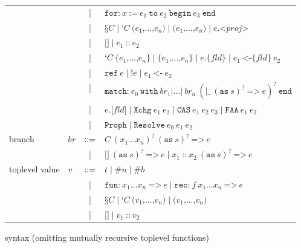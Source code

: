 \begin{figure}[tp]
\begin{tabular}{llcl}
  \\
    && | &
    $\texttt{for:}\ x\ \texttt{:=}\ e_1\ \texttt{to}\ e_2\ \texttt{begin}\ e_3\ \texttt{end}$
  \\
    && | &
    $\texttt{§}C \mid \texttt{‘} C\ \texttt{(} e_1 \texttt{,} \dots \texttt{,} e_n \texttt{)} \mid \texttt{(} e_1 \texttt{,} \dots \texttt{,} e_n \texttt{)} \mid e \texttt{.<} \mathit{proj} \texttt{>}$
  \\
    && | &
    $\texttt{[]} \mid e_1\ \texttt{::}\ e_2$
  \\
    && | &
    $\texttt{‘} C\ \texttt{\{} e_1 \texttt{,} \dots \texttt{,} e_n \texttt{\}} \mid \texttt{\{} e_1 \texttt{,} \dots \texttt{,} e_n \texttt{\}} \mid e \texttt{.\{} \mathit{fld} \texttt{\}} \mid e_1\ \texttt{<-\{} \mathit{fld} \texttt{\}}\ e_2$
  \\
    && | &
    $\texttt{ref}\ e \mid \texttt{!} e \mid e_1\ \texttt{<-}\ e_2$
  \\
    && | &
    $\texttt{match:}\ e_0\ \texttt{with}\ \mathit{br}_1 \texttt{|} \dots \texttt{|}\ \mathit{br}_n\ (\texttt{|\_}\ (\texttt{as}\ s)^?\ \texttt{=>}\ e)^?\ \texttt{end}$
  \\
    && | &
    $e \texttt{.[} \mathit{fld} \texttt{]} \mid \texttt{Xchg}\ e_1\ e_2 \mid \texttt{CAS}\ e_1\ e_2\ e_3 \mid \texttt{FAA}\ e_1\ e_2$
  \\
    && | &
    $\texttt{Proph} \mid \texttt{Resolve}\ e_0\ e_1\ e_2$
  \\
    branch &
    $\mathit{br}$
    & $\vcentcolon\vcentcolon=$ &
    $C\ (x_1 \dots x_n)^?\ (\texttt{as}\ s)^?\ \texttt{=>}\ e$
  \\
    && | &
    $\texttt{[]}\ (\texttt{as}\ s)^?\ \texttt{=>}\ e \mid x_1\ \texttt{::}\ x_2\ (\texttt{as}\ s)^?\ \texttt{=>}\ e$
  \\
    toplevel value &
    $v$
    & $\vcentcolon\vcentcolon=$ &
    $t \mid \texttt{\#} n \mid \texttt{\#} b$
  \\
    && | &
    $\texttt{fun:}\ x_1 \dots x_n\ \texttt{=>}\ e \mid \texttt{rec:}\ f\ x_1 \dots x_n\ \texttt{=>}\ e$
  \\
    && | &
    $\texttt{§}C \mid \texttt{‘} C\ \texttt{(} v_1 \texttt{,} \dots \texttt{,} v_n \texttt{)} \mid \texttt{(} v_1 \texttt{,} \dots \texttt{,} v_n \texttt{)}$
  \\
    && | &
    $\texttt{[]} \mid v_1\ \texttt{::}\ v_2$
\end{tabular}
\caption{\ZooLang syntax (omitting mutually recursive toplevel functions)}
\label{fig:zoo}
\end{figure}

